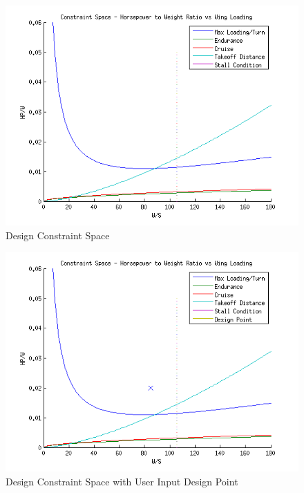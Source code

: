 \documentclass[]{article}
\begin{document}
\begin{figure}[H]
\centering
\includegraphics[scale=.75]{matlabdesignspace}
\caption{Design Constraint Space}
\end{figure}

\begin{figure}[H]
\centering
\includegraphics[scale=.75]{designspacewithpoint}
\caption{Design Constraint Space with User Input Design Point}
\end{figure}
\end{document}
